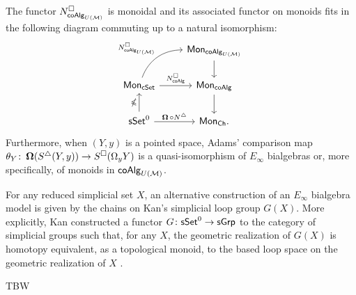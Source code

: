 \begin{theorem} \label{t:1st main thm in the intro}
    The functor $N^{\square}_{\mathsf{coAlg}_{U(\mathcal{M})}}$ is monoidal and its associated functor on monoids fits in the following diagram commuting up to a natural isomorphism:
    \begin{equation*}
    \begin{tikzcd}
    & \Mon_{\coAlg_{U(\M)}} \arrow[d] \\
    \Mon_{\cSet} \arrow[ru, "\cchains_{\coAlg_{U(\M)}}", out=70, in=180] \arrow[r, "\cchains_\coAlg"]
    & \Mon_{\coAlg} \arrow[d] \\
    \sSet^0 \arrow[r, "\cobar \circ \schains"] \arrow[u, "\gcobar"]
    & \Mon_{\Ch}.
    \end{tikzcd}
    \end{equation*}
    Furthermore, when $(Y, y)$ is a pointed space, Adams' comparison map $\theta_Y \colon \operatorname{\mathbf{\Omega}}(S^{\triangle}(Y, y)) \to S^{\square}(\Omega_y Y)$ is a quasi-isomorphism of $E_\infty$ bialgebras or, more specifically, of monoids in $\mathsf{coAlg}_{U(\mathcal{M})}$.
\end{theorem} 


For any reduced simplicial set $X$, an alternative construction of an $E_\infty$ bialgebra model is given by the chains on Kan's simplicial loop group $G(X)$.
More explicitly, Kan constructed a functor $G \colon \mathsf{sSet}^0 \to \mathsf{sGrp}$ to the category of simplicial groups such that, for any $X$, the geometric realization of $G(X)$ is homotopy equivalent, as a topological monoid, to the based loop space on the geometric realization of $X$ \cite{berger1995loops}.

TBW

